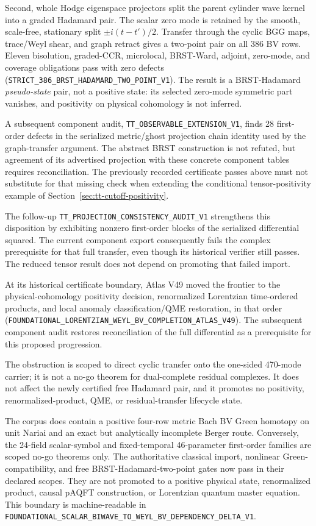 \documentclass[11pt]{article}
\theoremstyle{definition}
\theoremstyle{remark}
\newcommand{\cert}[1]{\nolinkurl{#1}}
\begin{document}
Second, whole Hodge eigenspace projectors split the parent cylinder wave
kernel into a graded Hadamard pair.  The scalar zero mode is retained by the
smooth, scale-free, stationary split $\pm i(t-t')/2$.  Transfer through the
cyclic BGG maps, trace/Weyl shear, and graph retract gives a two-point pair on
all 386 BV rows.  Eleven bisolution, graded-CCR, microlocal, BRST-Ward,
adjoint, zero-mode, and coverage obligations pass with zero defects
(\cert{STRICT_386_BRST_HADAMARD_TWO_POINT_V1}).  The result is a
BRST-Hadamard \emph{pseudo-state} pair, not a positive state: its selected
zero-mode symmetric part vanishes, and positivity on physical cohomology is
not inferred.

A subsequent component audit, \cert{TT_OBSERVABLE_EXTENSION_V1}, finds 28
first-order defects in the serialized metric/ghost projection chain identity
used by the graph-transfer argument. The abstract BRST construction is not
refuted, but agreement of its advertised projection with these concrete
component tables requires reconciliation. The previously recorded certificate
passes above must not substitute for that missing check when extending the
conditional tensor-positivity example of Section~\ref{sec:tt-cutoff-positivity}.

The follow-up \cert{TT_PROJECTION_CONSISTENCY_AUDIT_V1} strengthens this
disposition by exhibiting nonzero first-order blocks of the serialized
differential squared. The current component export consequently fails the
complex prerequisite for that full transfer, even though its historical
verifier still passes. The reduced tensor result does not depend on
promoting that failed import.

At its historical certificate boundary, Atlas V49 moved the frontier to the physical-cohomology positivity
decision, renormalized Lorentzian time-ordered products, and local anomaly
classification/QME restoration, in that order
(\cert{FOUNDATIONAL_LORENTZIAN_WEYL_BV_COMPLETION_ATLAS_V49}).
The subsequent component audit restores reconciliation of the full
differential as a prerequisite for this proposed progression.

The obstruction is scoped to direct cyclic transfer onto the one-sided
470-mode carrier; it is
not a no-go theorem for dual-complete residual complexes.  It does not affect
the newly certified free Hadamard pair, and it promotes no positivity,
renormalized-product, QME, or residual-transfer lifecycle state.

The corpus
does contain a positive four-row metric Bach BV Green homotopy on unit Nariai
and an exact but analytically incomplete Berger route.  Conversely, the
24-field scalar-symbol and fixed-temporal 46-parameter first-order families
are scoped no-go theorems only.  The authoritative classical import,
nonlinear Green-compatibility, and free BRST-Hadamard-two-point gates now pass
in their declared scopes.  They are not promoted to a positive physical
state, renormalized product, causal pAQFT construction, or Lorentzian quantum
master equation.
This boundary is machine-readable in
\cert{FOUNDATIONAL_SCALAR_BIWAVE_TO_WEYL_BV_DEPENDENCY_DELTA_V1}.
\end{document}
